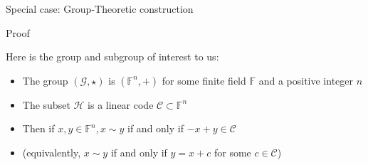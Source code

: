 \begin{parag}{Special case: Group-Theoretic construction}
\begin{subparag}{Proof}
    \end{subparag}
    Here is the group and subgroup of interest to us:
    \begin{itemize}
	    \item The group $\left(\mathcal{G}, \star \right)$ is $\left(\mathbb{F}^n, +\right)$ for some finite field $\mathbb{F}$ and a positive integer $n$
	    \item The subset $\mathcal{H}$ is a linear code $\mathcal{C} \subset \mathbb{F}^n$
	    \item Then if $x, y \in \mathbb{F}^n, x \sim y$ if and only if $-x + y \in \mathcal{C}$
	    \item (equivalently, $x \sim y$ if and only if $y =  x + c$ for some $c \in \mathcal{C}$)
    \end{itemize}
    
\end{parag}

